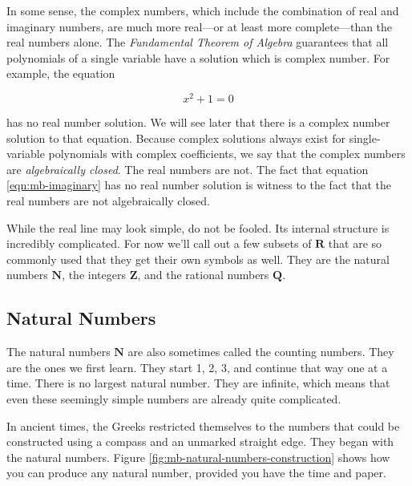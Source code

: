 In some sense, the complex numbers, which include the combination of real and imaginary numbers, are much more real---or at least more complete---than the real numbers alone. The \emph{Fundamental Theorem of Algebra} guarantees that all polynomials of a single variable have a solution which is complex number. For example, the equation

\begin{equation}\label{eqn:mb-imaginary} x^2+ 1 = 0 \end{equation}

has no real number solution. We will see later that there is a complex number solution to that equation. Because complex solutions always exist for single-variable polynomials with complex coefficients, we say that the complex numbers are \emph{algebraically closed}. The real numbers are not. The fact that equation \ref{eqn:mb-imaginary} has no real number solution is witness to the fact that the real numbers are not algebraically closed.

While the real line may look simple, do not be fooled. Its internal structure is incredibly complicated. For now we'll call out a few subsets of $\mathbf{R}$ that are so commonly used that they get their own symbols as well. They are the natural numbers $\mathbf{N}$, the integers $\mathbf{Z}$, and the rational numbers $\mathbf{Q}$.

\subsection{Natural Numbers}
The natural numbers $\textbf{N}$ are also sometimes called the counting numbers. They are the ones we first learn. They start 1, 2, 3, and continue that way one at a time. There is no largest natural number. They are infinite, which means that even these seemingly simple numbers are already quite complicated.

In ancient times, the Greeks restricted themselves to the numbers that could be constructed using a compass and an unmarked straight edge. They began with the natural numbers. Figure \ref{fig:mb-natural-numbers-construction} shows how you can produce any natural number, provided you have the time and paper.

